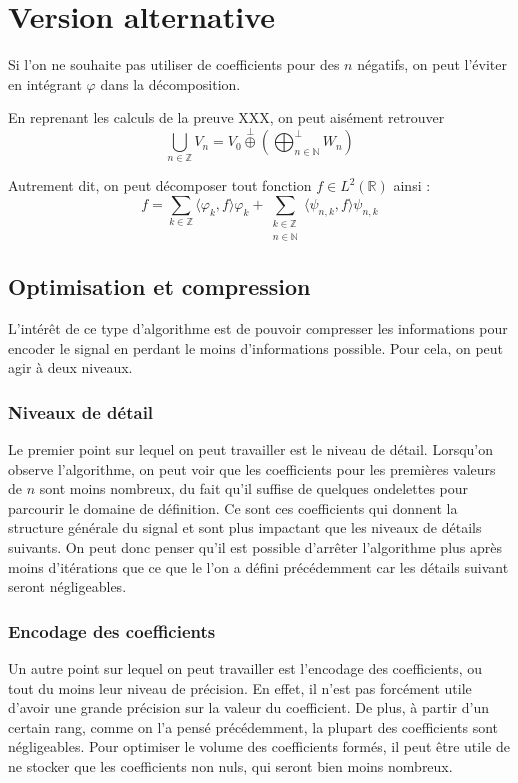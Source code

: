 \section{Version alternative}

Si l'on ne souhaite pas utiliser de coefficients pour des $n$ négatifs, on peut l'éviter en intégrant $\varphi$ dans la décomposition.

En reprenant les calculs de la preuve XXX, on peut aisément retrouver $$\bigcup_{n \in \mathbb{Z}} V_n = V_0 \stackrel{\perp}{\oplus} \left(\bigoplus^{\bot}_{n \in \mathbb{N}} W_n\right)$$

Autrement dit, on peut décomposer tout fonction $f \in L^2(\mathbb{R})$ ainsi : $$f = \sum_{k \in \mathbb{Z}} \langle \varphi_k, f \rangle \varphi_k + \sum_{\substack{k \in \mathbb{Z} \\ n \in \mathbb{N}}} \langle \psi_{n, k}, f \rangle \psi_{n, k}$$



\subsection{Optimisation et compression}

L'intérêt de ce type d'algorithme est de pouvoir compresser les informations pour encoder le signal en perdant le moins d'informations possible. Pour cela, on peut agir à deux niveaux.

\subsubsection{Niveaux de détail}
	Le premier point sur lequel on peut travailler est le niveau de détail. Lorsqu'on observe l'algorithme, on peut voir que les coefficients pour les premières valeurs de $n$ sont moins nombreux, du fait qu'il suffise de quelques ondelettes pour parcourir le domaine de définition. Ce sont ces coefficients qui donnent la structure générale du signal et sont plus impactant que les niveaux de détails suivants. On peut donc penser qu'il est possible d'arrêter l'algorithme plus après moins d'itérations que ce que le l'on a défini précédemment car les détails suivant seront négligeables. 

\subsubsection{Encodage des coefficients}
	Un autre point sur lequel on peut travailler est l'encodage des coefficients, ou tout du moins leur niveau de précision. En effet, il n'est pas forcément utile d'avoir une grande précision sur la valeur du coefficient. De plus, à partir d'un certain rang, comme on l'a pensé précédemment, la plupart des coefficients sont négligeables. Pour optimiser le volume des coefficients formés, il peut être utile de ne stocker que les coefficients non nuls, qui seront bien moins nombreux. 

